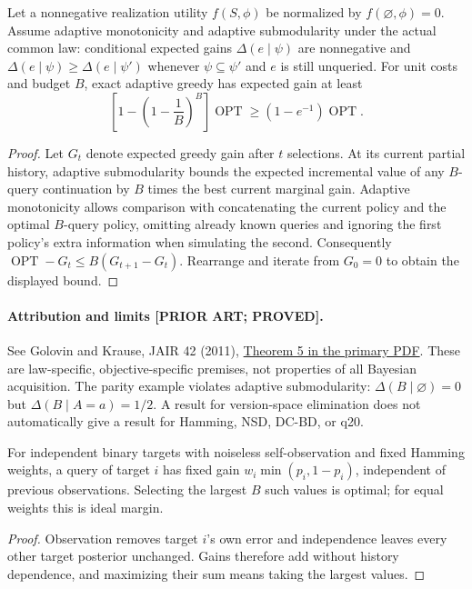 \begin{theorem}
Let a nonnegative realization utility $f(S,\phi)$ be normalized by
$f(\varnothing,\phi)=0$.  Assume adaptive monotonicity and adaptive
submodularity under the actual common law: conditional expected gains
$\Delta(e\mid\psi)$ are nonnegative and
$\Delta(e\mid\psi)\geq\Delta(e\mid\psi')$ whenever $\psi\subseteq\psi'$
and $e$ is still unqueried.  For unit costs and budget $B$, exact adaptive
greedy has expected gain at least
\[
 \left[1-\left(1-\frac1B\right)^B\right]\operatorname{OPT}
 \geq(1-e^{-1})\operatorname{OPT}.
\]
\end{theorem}
\begin{proof}
Let $G_t$ denote expected greedy gain after $t$ selections.  At its current
partial history, adaptive submodularity bounds the expected incremental
value of any $B$-query continuation by $B$ times the best current marginal
gain.  Adaptive monotonicity allows comparison with concatenating the
current policy and the optimal $B$-query policy, omitting already known
queries and ignoring the first policy's extra information when simulating
the second.  Consequently
$\operatorname{OPT}-G_t\leq B(G_{t+1}-G_t)$.
Rearrange and iterate from $G_0=0$ to obtain the displayed bound.
\end{proof}

\paragraph{Attribution and limits [PRIOR ART; PROVED].}
See Golovin and Krause, JAIR 42 (2011),
\href{https://arxiv.org/pdf/1003.3967}{Theorem 5 in the primary PDF}.
These are law-specific, objective-specific premises, not properties of
all Bayesian acquisition.  The parity example violates adaptive
submodularity: $\Delta(B\mid\varnothing)=0$ but
$\Delta(B\mid A=a)=1/2$.  A result for version-space elimination does not
automatically give a result for Hamming, NSD, DC-BD, or q20.

\begin{proposition}
For independent binary targets with noiseless self-observation and fixed
Hamming weights, a query of target $i$ has fixed gain
$w_i\min(p_i,1-p_i)$, independent of previous observations.  Selecting the
largest $B$ such values is optimal; for equal weights this is ideal margin.
\end{proposition}
\begin{proof}
Observation removes target $i$'s own error and independence leaves every
other target posterior unchanged.  Gains therefore add without history
dependence, and maximizing their sum means taking the largest values.
\end{proof}

